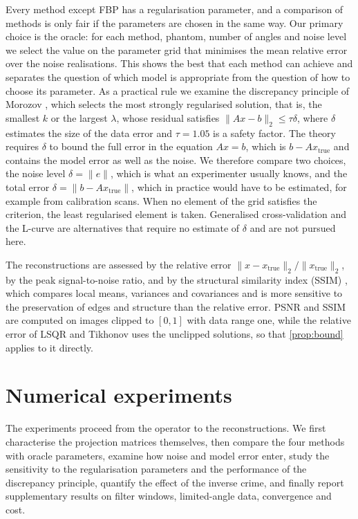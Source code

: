 \documentclass[11pt,a4paper]{article}
\numberwithin{equation}{section}
\theoremstyle{remark}
\newcommand{\xt}{x_{\mathrm{true}}}
\begin{document}
Every method except FBP has a regularisation parameter, and a comparison of methods is only fair if the parameters are chosen in the same way. Our primary choice is the oracle: for each method, phantom, number of angles and noise level we select the value on the parameter grid that minimises the mean relative error over the noise realisations. This shows the best that each method can achieve and separates the question of which model is appropriate from the question of how to choose its parameter. As a practical rule we examine the discrepancy principle of Morozov \citep{morozov1966,engl1996}, which selects the most strongly regularised solution, that is, the smallest $k$ or the largest $\lambda$, whose residual satisfies $\|Ax-b\|_2\le\tau\delta$, where $\delta$ estimates the size of the data error and $\tau=1.05$ is a safety factor. The theory requires $\delta$ to bound the full error in the equation $Ax=b$, which is $b-A\xt$ and contains the model error as well as the noise. We therefore compare two choices, the noise level $\delta=\|e\|$, which is what an experimenter usually knows, and the total error $\delta=\|b-A\xt\|$, which in practice would have to be estimated, for example from calibration scans. When no element of the grid satisfies the criterion, the least regularised element is taken. Generalised cross-validation \citep{golub1979} and the L-curve \citep{hansen1992} are alternatives that require no estimate of $\delta$ and are not pursued here.

The reconstructions are assessed by the relative error $\|x-\xt\|_2/\|\xt\|_2$, by the peak signal-to-noise ratio, and by the structural similarity index (SSIM) \citep{wang2004}, which compares local means, variances and covariances and is more sensitive to the preservation of edges and structure than the relative error. PSNR and SSIM are computed on images clipped to $[0,1]$ with data range one, while the relative error of LSQR and Tikhonov uses the unclipped solutions, so that \cref{prop:bound} applies to it directly.

\section{Numerical experiments}\label{sec:results}

The experiments proceed from the operator to the reconstructions. We first characterise the projection matrices themselves, then compare the four methods with oracle parameters, examine how noise and model error enter, study the sensitivity to the regularisation parameters and the performance of the discrepancy principle, quantify the effect of the inverse crime, and finally report supplementary results on filter windows, limited-angle data, convergence and cost.
\end{document}
